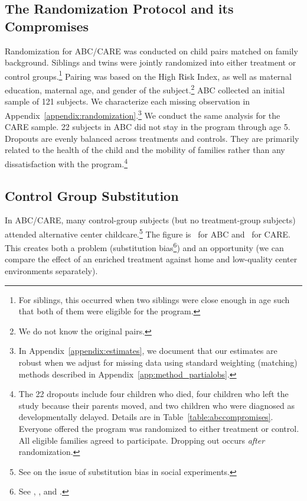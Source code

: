 \subsection{The Randomization Protocol and its Compromises} \label{section:randomization}

Randomization for ABC/CARE was conducted on child pairs matched on family background. Siblings and twins were jointly randomized into either treatment or control groups.\footnote{For siblings, this occurred when two siblings were close enough in age such that both of them were eligible for the program.} Pairing was based on the High Risk Index, as well as maternal education, maternal age, and gender of the subject.\footnote{We do not know the original pairs.} ABC collected an initial sample of 121 subjects. We characterize each missing observation in Appendix~\ref{appendix:randomization}.\footnote{In Appendix~\ref{appendix:estimates}, we document that our estimates are robust when we adjust for missing data using standard weighting (matching) methods described in Appendix~\ref{app:method_partialobs}.} We conduct the same analysis for the CARE sample. 22 subjects in ABC did not stay in the program through age 5. Dropouts are evenly balanced across treatments and controls. They are primarily related to the health of the child and the mobility of families rather than any dissatisfaction with the program.\footnote{The 22 dropouts include four children who died, four children who left the study because their parents moved, and two children who were diagnosed as developmentally delayed. Details are in Table~\ref{table:abccompromises}. Everyone offered the program was randomized to either treatment or control. All eligible families agreed to participate. Dropping out occurs \emph{after} randomization.}

\subsection{Control Group Substitution}

In ABC/CARE, many control-group subjects (but no treatment-group subjects) attended alternative center childcare.\footnote{See \cite{Heckman_Hohmann_etal_2000_QJE} on the issue of substitution bias in social experiments.} The figure is \treatsubsabc\ for ABC and \treatsubscarec\ for CARE. This creates both a problem (substitution bias\footnote{See \cite{Heckman_1992_randomization}, \cite{Heckman_Hohmann_etal_2000_QJE}, and \cite{Kline_Walters_2016_QJE}.}) and an opportunity (we can compare the effect of an enriched treatment against home and low-quality center environments separately).

